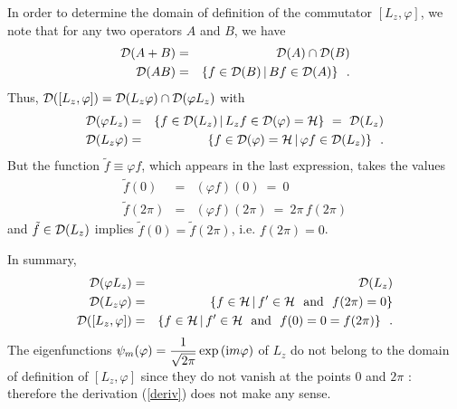 \documentclass[a4wide,12pt]{report}
\begin{document}
In order to determine the domain of definition of the commutator 
$[L_z, \varphi ]$, we note that for any two operators $A$ and $B$,
we have 
\begin{eqnarray}
{\cal D} (A+B) & = & {\cal D}(A) \cap {\cal D}(B)
\\
{\cal D} (AB) & = & \{ f \in {\cal D}(B)\, | \, Bf \in {\cal D}(A) \}
\nonumber
\ \ .
\end{eqnarray}
 Thus, 
${\cal D} ([L_z, \varphi]) = {\cal D}(L_z \varphi ) \cap
{\cal D} (\varphi L_z )$ with 
\begin{eqnarray*}
{\cal D} (\varphi L_z )
& = & \{ f \in {\cal D}(L_z) \, | \, L_z f \in {\cal D}(\varphi )= {\cal H} \}
\ = \ {\cal D} (L_z )
\\
{\cal D} (L_z  \varphi) & = &
\{ f \in {\cal D}(\varphi) ={\cal H} \, | \, \varphi  f \in {\cal D}(L_z) \}
\ \ .
\end{eqnarray*}
But the function 
$\tilde f \equiv \varphi f$, which appears in the last expression,  
takes the values 
\begin{eqnarray*}
\tilde f (0) & = & (\varphi f)(0) \ = \ 0
\\
\tilde f (2 \pi ) & = & (\varphi f)(2\pi ) \ = \ 2 \pi \, f (2 \pi)
\end{eqnarray*}
 and $\tilde f \in {\cal D}(L_z)$ implies 
$\tilde f (0) =
\tilde f (2 \pi )$, i.e. $f(2\pi ) = 0$.
 
In summary, 
\begin{eqnarray}
{\cal D} (\varphi L_z )
& = & {\cal D} (L_z )
\nonumber
\\
{\cal D} (L_z  \varphi) & = &
\{ f \in {\cal H} \, | \, f^{\prime} \in {\cal H} \ \ {\rm and} \ \
f (2 \pi ) =0 \}
\\
{\cal D} ([ L_z , \varphi ]) & = &
\{ f \in {\cal H} \, | \, f^{\prime} \in {\cal H} \ \ {\rm and} \ \
f (0) =0 =
f (2 \pi ) \}
\ \ .
\nonumber
\end{eqnarray}
The eigenfunctions 
$\psi_m ( \varphi ) = \displaystyle{1 \over \sqrt{2\pi} } \, {\rm exp}\,
( {\rm i}  m \varphi )$ of $L_z$
do not belong to the domain of definition of 
$[ L_z , \varphi ]$ since they do not vanish at the points 
$0$ and 
$2\pi$ : therefore the 
derivation (\ref{deriv}) does not make any sense. 
 
\bigskip
 
\end{document}
